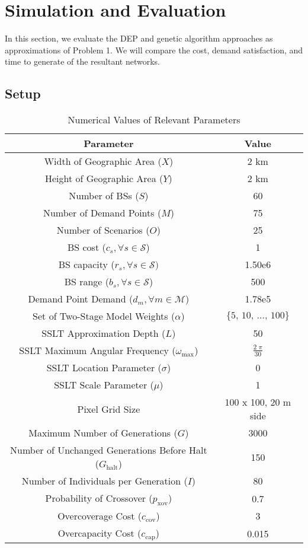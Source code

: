 \documentclass[onecolumn,draftcls]{IEEEtran}
\begin{document}
\section{Simulation and Evaluation} \label{sec:sim}
In this section, we evaluate the DEP and genetic algorithm approaches as approximations of Problem 1.  We will compare the cost, demand satisfaction, and time to generate of the resultant networks.

\subsection{Setup} \label{subsec:setup}

\begin{table} \centering
\caption{Numerical Values of Relevant Parameters}
\begin{tabular}{|c|c|} 
\hline
\textbf{Parameter} & \textbf{Value} \\
\hline
\hline 
Width of Geographic Area ($X$) & 2 km \\
\hline
Height of Geographic Area ($Y$) & 2 km \\
\hline
Number of BSs ($S$) & 60 \\ 
\hline 
Number of Demand Points ($M$) & 75 \\ 
\hline 
Number of Scenarios ($O$) & 25 \\ 
\hline 
BS cost ($c_s, \forall s \in \mathcal{S}$) & 1 \\ 
\hline 
BS capacity ($r_s, \forall s \in \mathcal{S})$ & 1.50e6 \\ 
\hline
BS range ($b_s, \forall s \in \mathcal{S}$) & 500 \\
\hline 
Demand Point Demand ($d_m, \forall m \in \mathcal{M}$) & 1.78e5 \\ 
\hline 
Set of Two-Stage Model Weights ($\alpha$) & $\{5,\, 10,\, \ldots,\, 100\}$ \\ 
\hline 
\hline
SSLT Approximation Depth ($L$) & 50 \\ 
\hline
SSLT Maximum Angular Frequency ($\omega_{\max}$) & $\frac{2 \; \pi}{30}$ \\
\hline 
SSLT Location Parameter ($\sigma$) & 0 \\ 
\hline 
SSLT Scale Parameter ($\mu$) & 1 \\ 
\hline
Pixel Grid Size & 100 x 100, 20 m side\\
\hline 
\hline
Maximum Number of Generations ($G$) & 3000 \\ 
\hline
Number of Unchanged Generations Before Halt ($G_\text{halt}$) & 150 \\
\hline 
Number of Individuals per Generation ($I$) & 80 \\ 
\hline 
Probability of Crossover ($p_\text{xov}$) & 0.7 \\ 
\hline 
Overcoverage Cost ($c_\text{cov}$) & 3 \\
\hline
Overcapacity Cost ($c_\text{cap}$) & 0.015 \\
\hline
\end{tabular}
\label{tab:simval}
\end{table}
\end{document}
